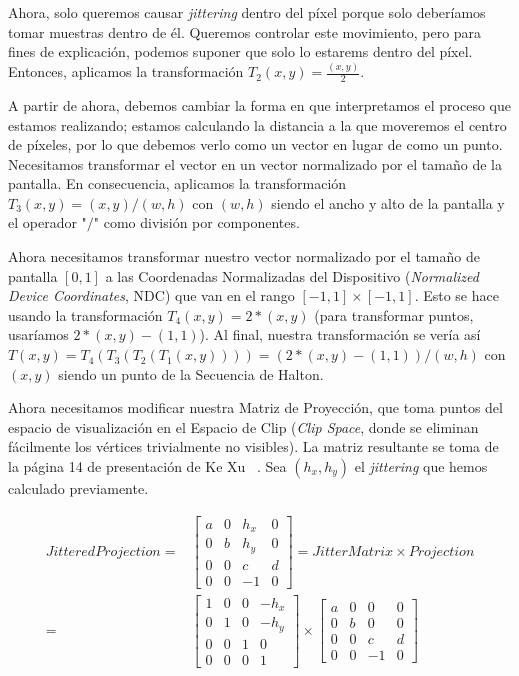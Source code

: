 \documentclass[pregrado]{tesis-usb} %
\begin{document}
Ahora, solo queremos causar \textit{jittering} dentro del píxel porque solo deberíamos tomar muestras dentro de él. Queremos controlar este movimiento, pero para fines de explicación, podemos suponer que solo lo estarems dentro del píxel. Entonces, aplicamos la transformación $T_2 (x, y) = \frac{(x, y)}{2}$.

A partir de ahora, debemos cambiar la forma en que interpretamos el proceso que estamos realizando; estamos calculando la distancia a la que moveremos el centro de píxeles, por lo que debemos verlo como un vector en lugar de como un punto. Necesitamos transformar el vector en un vector normalizado por el tamaño de la pantalla. En consecuencia, aplicamos la transformación $T_3 (x, y) = (x, y) / (w, h)$ con $(w, h)$ siendo el ancho y alto de la pantalla y el operador "$/$" como división por componentes.

Ahora necesitamos transformar nuestro vector normalizado por el tamaño de pantalla $ [0, 1] $ a las Coordenadas Normalizadas del Dispositivo (\textit{Normalized Device Coordinates}, NDC) que van en el rango $ [- 1, 1] \times [-1, 1]$. Esto se hace usando la transformación $T_4 (x, y) = 2 * (x, y)$ (para transformar puntos, usaríamos $2 * (x, y) - (1, 1)$). Al final, nuestra transformación se vería así $T (x, y) = T_4 (T_3 (T_2 (T_1 (x, y)))) = (2 * (x, y) - (1, 1)) / (w, h) $ con $ (x, y) $ siendo un punto de la Secuencia de Halton.

Ahora necesitamos modificar nuestra Matriz de Proyección, que toma puntos del espacio de visualización en el Espacio de Clip (\textit{Clip Space}, donde se eliminan fácilmente los vértices trivialmente no visibles). La matriz resultante se toma de la página 14 de presentación de Ke Xu ~\cite{XU2016}. Sea $ (h_x, h_y) $ el \textit{jittering} que hemos calculado previamente.

\begin{equation}
\begin{split}
JitteredProjection = & \begin{bmatrix*} 
a & 0 & h_x & 0 \\ 
0 & b & h_y & 0 \\
0 & 0 & c & d   \\
0 & 0 & -1 & 0   \end{bmatrix*} = JitterMatrix\times Projection \\
= & \begin{bmatrix*} 
1 & 0 & 0 & -h_x \\ 
0 & 1 & 0 & -h_y \\
0 & 0 & 1 & 0   \\
0 & 0 & 0 & 1   \end{bmatrix*} \times \begin{bmatrix*} 
a & 0 & 0 & 0 \\ 
0 & b & 0 & 0 \\
0 & 0 & c & d   \\
0 & 0 & -1 & 0   \end{bmatrix*}
\end{split}
\end{equation}
\end{document}
